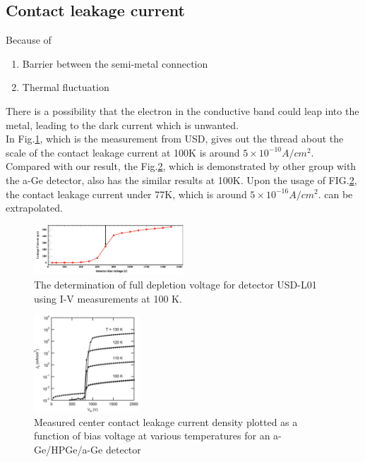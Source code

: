 \documentclass[%
 reprint,
 amsmath,amssymb,
 aps,
]{revtex4-2}
\begin{document}
\subsection{Contact leakage current}
Because of 
\begin{enumerate}
	\item Barrier between the semi-metal connection
	\item Thermal fluctuation
\end{enumerate}

There is a possibility that the electron in the conductive band could leap into the metal, leading to the dark current which is unwanted.\\

In Fig.\ref{Contact_Leakage_2}\cite{Wei_2018}, which is the measurement from USD, gives out the thread about the scale of the contact leakage current at 100K is around $5 \times 10^{-10}A/cm^{2}$. Compared with our result, the Fig.\ref{Contact_Leakage_1}\cite{LOOKER2015138}, which is demonstrated by other group with the a-Ge detector, also has the similar results at 100K. Upon the usage of FIG.\ref{Contact_Leakage_1}, the contact leakage current under 77K, which is around $5 \times 10^{-16} A/cm^{2}$. can be extrapolated.\\

\begin{figure}[h]
  \centering
  \includegraphics[width=0.5\textwidth]{SHEME/Contact_Leakage_2.png}
  \caption{The determination of full depletion voltage for detector USD-L01 using  I-V measurements at 100 K.}
  \label{Contact_Leakage_2}
\end{figure}

\begin{figure}[h]
  \centering
  \includegraphics[width=0.35\textwidth]{SHEME/Contact_Leakage_1.png}
  \caption{Measured center contact leakage current density plotted as a function of bias voltage at various temperatures for an a-Ge/HPGe/a-Ge detector}
  \label{Contact_Leakage_1}
\end{figure}
\end{document}
